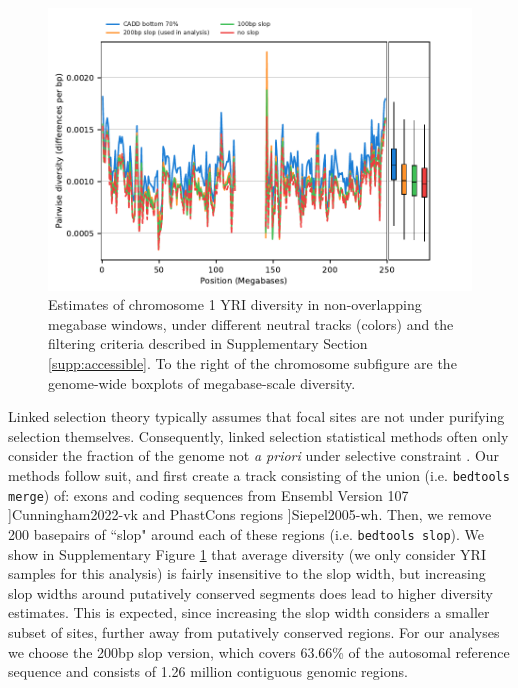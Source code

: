 \documentclass[11pt]{article}
\begin{document}
\begin{figure}[!htb]
  \centering
  \includegraphics[width=\textwidth]{figures/supplementary/neutral_tracks.pdf}

  \caption{Estimates of chromosome 1 YRI diversity in non-overlapping megabase
      windows, under different neutral tracks (colors) and the filtering
      criteria described in Supplementary Section \ref{supp:accessible}. To the
      right of the chromosome subfigure are the genome-wide boxplots of
      megabase-scale diversity. } 

  \label{suppfig:neutral-tracks}
\end{figure}

Linked selection theory typically assumes that focal sites are not under
purifying selection themselves. Consequently, linked selection statistical
methods often only consider the fraction of the genome not \emph{a priori}
under selective constraint \parencite[e.g. Appendix Section
3.1]{Murphy2022-sj}. Our methods follow suit, and first create a track
consisting of the union (i.e. \texttt{bedtools merge}) of: exons and coding
sequences from Ensembl Version 107
]{Cunningham2022-vk} and PhastCons
regions ]{Siepel2005-wh}. Then, we remove
200 basepairs of ``slop" around each of these regions (i.e. \texttt{bedtools
slop}). We show in Supplementary Figure \ref{suppfig:neutral-tracks} that
average diversity (we only consider YRI samples for this analysis) is fairly
insensitive to the slop width, but increasing slop widths around putatively
conserved segments does lead to higher diversity estimates. This is expected,
since increasing the slop width considers a smaller subset of sites, further
away from putatively conserved regions. For our analyses we choose the 200bp
slop version, which covers 63.66\% of the autosomal reference sequence and
consists of 1.26 million contiguous genomic regions.
\end{document}
